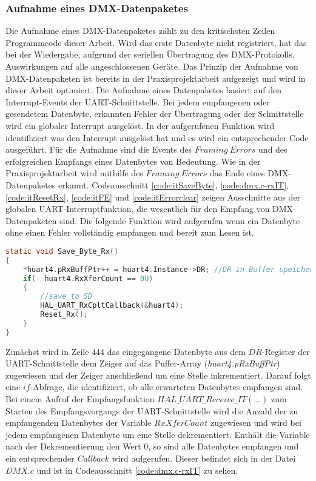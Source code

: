 
\subsubsection{Aufnahme eines DMX-Datenpaketes}
Die Aufnahme eines DMX-Datenpaketes zählt zu den kritischsten Zeilen Programmcode dieser Arbeit. Wird das erste Datenbyte nicht registriert, hat das bei der Wiedergabe, aufgrund der seriellen Übertragung des DMX-Protokolls, Auswirkungen auf alle angeschlossenen Geräte. Das Prinzip der Aufnahme von DMX-Datenpaketen ist bereits in der Praxisprojektarbeit aufgezeigt und wird in dieser Arbeit optimiert.
Die Aufnahme eines Datenpaketes basiert auf den Interrupt-Events der UART-Schnittstelle. Bei jedem empfangenen oder gesendetem Datenbyte, erkannten Fehler der Übertragung oder der Schnittstelle wird ein globaler Interrupt ausgelöst. In der aufgerufenen Funktion wird identifiziert was den Interrupt ausgelöst hat und es wird ein entsprechender Code ausgeführt. Für die Aufnahme sind die Events des $Framing\ Errors$ und des erfolgreichen Empfangs eines Datenbytes von Bedeutung. Wie in der Praxisprojektarbeit wird mithilfe des $Framing\ Errors$ das Ende eines DMX-Datenpaketes erkannt. Codeausschnitt \ref{code:itSaveByte}, \ref{code:dmx.c-rxIT}, \ref{code:itResetRx}, \ref{code:itFE} und \ref{code:itErrorclear} zeigen Ausschnitte aus der globalen UART-Interruptfunktion, die wesentlich für den Empfang von DMX-Datenpaketen sind. Die folgende Funktion wird aufgerufen wenn ein Datenbyte ohne einen Fehler vollständig empfangen und bereit zum Lesen ist. 
\begin{lstlisting}[caption = stm32f4xx\_it.c: UART Save\_Byte\_Rx(),
label = code:itSaveByte, 
language = C, 
firstnumber = 442]
static void Save_Byte_Rx()
{
	*huart4.pRxBuffPtr++ = huart4.Instance->DR; //DR in Buffer speichern
	if(--huart4.RxXferCount == 0U)
	{
		//save to SD
		HAL_UART_RxCpltCallback(&huart4);
		Reset_Rx();
	}
}
\end{lstlisting}
Zunächst wird in Zeile 444 das eingegangene Datenbyte aus dem $DR$-Register der UART-Schnittstelle dem Zeiger auf das Puffer-Array (\textit{huart4.pRxBuffPtr}) zugewiesen und der Zeiger anschließend um eine Stelle inkrementiert.
Darauf folgt eine $if$-Abfrage, die identifiziert, ob alle erwarteten Datenbytes empfangen sind. Bei einem Aufruf der Empfangsfunktion $HAL\_UART\_Receive\_IT(...)$ zum Starten des Empfangsvorgangs der UART-Schnittstelle wird die Anzahl der zu empfangenden Datenbytes der Variable $RxXferCount$ zugewiesen und wird bei jedem empfangenen Datenbyte um eine Stelle dekrementiert. Enthält die Variable nach der Dekrementierung den Wert 0, so sind alle Datenbytes empfangen und ein entsprechender $Callback$ wird aufgerufen. Dieser befindet sich in der Datei $DMX.c$ und ist in Codeausschnitt \ref{code:dmx.c-rxIT} zu sehen. 
